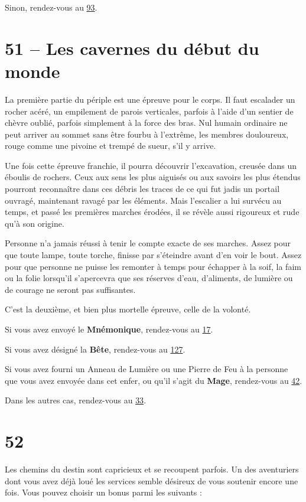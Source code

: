 \documentclass{report}
\newcommand{\gsection}[1]{
    \section{#1}
    \label{section-#1}
}
\newcommand{\glink}[1]{\hyperref[section-#1]{#1}}
\newcommand{\hero}[1]{\textbf{#1}}
\begin{document}
Sinon, rendez-vous au \glink{93}.

\gsection{51 – Les cavernes du début du monde}

La première partie du périple est une épreuve pour le corps. Il faut escalader un rocher acéré, un empilement de parois verticales, parfois à l'aide d'un sentier de chèvre oublié, parfois simplement à la force des bras. Nul humain ordinaire ne peut arriver au sommet sans être fourbu à l'extrême, les membres douloureux, rouge comme une pivoine et trempé de sueur, s'il y arrive.

Une fois cette épreuve franchie, il pourra découvrir l'excavation, creusée dans un éboulis de rochers. Ceux aux sens les plus aiguisés ou aux savoirs les plus étendus pourront reconnaître dans ces débris les traces de ce qui fut jadis un portail ouvragé, maintenant ravagé par les éléments. Mais l'escalier a lui survécu au temps, et passé les premières marches érodées, il se révèle aussi rigoureux et rude qu'à son origine.

Personne n'a jamais réussi à tenir le compte exacte de ses marches. Assez pour que toute lampe, toute torche, finisse par s'éteindre avant d'en voir le bout. Assez pour que personne ne puisse les remonter à temps pour échapper à la soif, la faim ou la folie lorsqu'il s'apercevra que ses réserves d'eau, d'aliments, de lumière ou de courage ne seront pas suffisantes.

C'est la deuxième, et bien plus mortelle épreuve, celle de la volonté.

Si vous avez envoyé le \hero{Mnémonique}, rendez-vous au \glink{17}.

Si vous avez désigné la \hero{Bête}, rendez-vous au \glink{127}.

Si vous avez fourni un Anneau de Lumière ou une Pierre de Feu à la personne que vous avez envoyée dans cet enfer, ou qu'il s'agit du \hero{Mage}, rendez-vous au \glink{42}.

Dans les autres cas, rendez-vous au \glink{33}.

\gsection{52}

Les chemins du destin sont capricieux et se recoupent parfois. Un des aventuriers dont vous avez déjà loué les services semble désireux de vous soutenir encore une fois. Vous pouvez choisir un bonus parmi les suivants :
\end{document}
